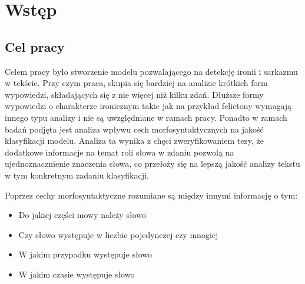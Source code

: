 \newpage %
\section{Wstęp}
\subsection{Cel pracy}

Celem pracy było stworzenie modelu pozwalającego na detekcję ironii i sarkazmu w tekście. Przy czym praca, skupia się bardziej na analizie krótkich form wypowiedzi, składających się z nie więcej niż kilku zdań. Dłuższe formy wypowiedzi o charakterze ironicznym takie jak na przykład felietony wymagają innego typu analizy i nie są uwzględniane w ramach pracy. Ponadto w ramach badań podjęta jest analiza wpływu cech morfosyntaktycznych na jakość klasyfikacji modelu. Analiza ta wynika z chęci zweryfikowaniem tezy, że dodatkowe informacje na temat roli słowa w zdaniu pozwolą na ujednoznacznienie znaczenia słowa, co przełoży się na lepszą jakość analizy tekstu w tym konkretnym zadaniu klasyfikacji.

Poprzez cechy morfosyntaktyczne rozumiane są między innymi informację o tym\cite[]{Radziszewski2012}:
\begin{itemize}
    \item Do jakiej części mowy należy słowo
    \item Czy słowo występuje w liczbie pojedynczej czy mnogiej
    \item W jakim przypadku występuje słowo
    \item W jakim czasie występuje słowo
\end{itemize}





